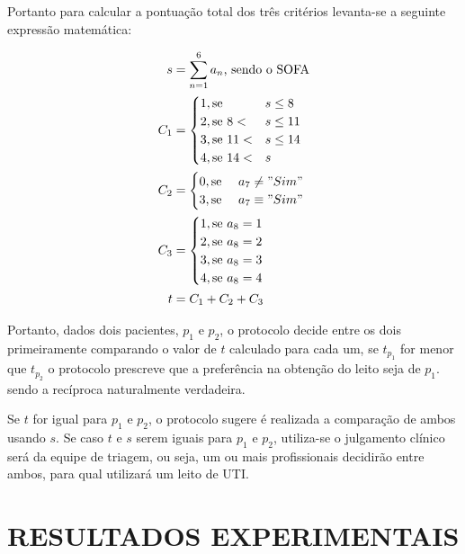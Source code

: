 \documentclass[12pt]{article}
\begin{document}
Portanto para calcular a pontuação total dos três critérios levanta-se a seguinte expressão matemática:

\[
\begin{split}
    s &= \sum_{n=1}^{6} a_n\text{, sendo o SOFA} \\
    C_1 &= \begin{cases}
        1, \text{se } & s \le 8 \\
        2, \text{se } 8 < & s \le 11 \\
        3, \text{se } 11 < & s \le  14 \\
        4, \text{se } 14 < & s \\
    \end{cases} \\
    C_2 &= \begin{cases}
        0, \text{se } & a_7 \neq "Sim" \\
        3, \text{se } & a_7 \equiv "Sim" \\
    \end{cases} \\
    C_3 &= \begin{cases}
        1, \text{se } a_8 = 1 \\
        2, \text{se } a_8 = 2 \\
        3, \text{se } a_8 = 3 \\
        4, \text{se } a_8 = 4 \\
    \end{cases} \\
    t &= C_1 + C_2 + C_3 \\
\end{split}
\] 

Portanto, dados dois pacientes, $p_1$ e $p_2$, o protocolo decide entre os dois primeiramente comparando o valor de $t$ calculado para cada um, se  $t_{p_1}$ for menor que $t_{p_2}$ o protocolo prescreve que a preferência na obtenção do leito seja de $p_1.$ sendo a recíproca naturalmente verdadeira.

Se $t$ for igual para $p_1$ e $p_2$, o protocolo sugere é realizada a comparação de ambos usando $s$. Se caso $t$ e $s$ serem iguais para $p_1$ e $p_2$, utiliza-se o julgamento clínico será da equipe de triagem, ou seja, um ou mais profissionais decidirão entre ambos, para qual utilizará um leito de UTI.


\section{RESULTADOS EXPERIMENTAIS}
\end{document}
